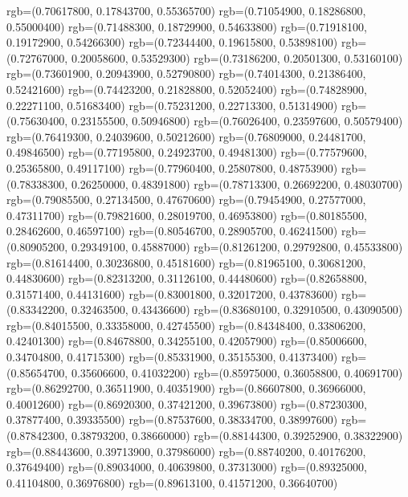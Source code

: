{{        rgb=(0.70617800, 0.17843700, 0.55365700)
        rgb=(0.71054900, 0.18286800, 0.55000400)
        rgb=(0.71488300, 0.18729900, 0.54633800)
        rgb=(0.71918100, 0.19172900, 0.54266300)
        rgb=(0.72344400, 0.19615800, 0.53898100)
        rgb=(0.72767000, 0.20058600, 0.53529300)
        rgb=(0.73186200, 0.20501300, 0.53160100)
        rgb=(0.73601900, 0.20943900, 0.52790800)
        rgb=(0.74014300, 0.21386400, 0.52421600)
        rgb=(0.74423200, 0.21828800, 0.52052400)
        rgb=(0.74828900, 0.22271100, 0.51683400)
        rgb=(0.75231200, 0.22713300, 0.51314900)
        rgb=(0.75630400, 0.23155500, 0.50946800)
        rgb=(0.76026400, 0.23597600, 0.50579400)
        rgb=(0.76419300, 0.24039600, 0.50212600)
        rgb=(0.76809000, 0.24481700, 0.49846500)
        rgb=(0.77195800, 0.24923700, 0.49481300)
        rgb=(0.77579600, 0.25365800, 0.49117100)
        rgb=(0.77960400, 0.25807800, 0.48753900)
        rgb=(0.78338300, 0.26250000, 0.48391800)
        rgb=(0.78713300, 0.26692200, 0.48030700)
        rgb=(0.79085500, 0.27134500, 0.47670600)
        rgb=(0.79454900, 0.27577000, 0.47311700)
        rgb=(0.79821600, 0.28019700, 0.46953800)
        rgb=(0.80185500, 0.28462600, 0.46597100)
        rgb=(0.80546700, 0.28905700, 0.46241500)
        rgb=(0.80905200, 0.29349100, 0.45887000)
        rgb=(0.81261200, 0.29792800, 0.45533800)
        rgb=(0.81614400, 0.30236800, 0.45181600)
        rgb=(0.81965100, 0.30681200, 0.44830600)
        rgb=(0.82313200, 0.31126100, 0.44480600)
        rgb=(0.82658800, 0.31571400, 0.44131600)
        rgb=(0.83001800, 0.32017200, 0.43783600)
        rgb=(0.83342200, 0.32463500, 0.43436600)
        rgb=(0.83680100, 0.32910500, 0.43090500)
        rgb=(0.84015500, 0.33358000, 0.42745500)
        rgb=(0.84348400, 0.33806200, 0.42401300)
        rgb=(0.84678800, 0.34255100, 0.42057900)
        rgb=(0.85006600, 0.34704800, 0.41715300)
        rgb=(0.85331900, 0.35155300, 0.41373400)
        rgb=(0.85654700, 0.35606600, 0.41032200)
        rgb=(0.85975000, 0.36058800, 0.40691700)
        rgb=(0.86292700, 0.36511900, 0.40351900)
        rgb=(0.86607800, 0.36966000, 0.40012600)
        rgb=(0.86920300, 0.37421200, 0.39673800)
        rgb=(0.87230300, 0.37877400, 0.39335500)
        rgb=(0.87537600, 0.38334700, 0.38997600)
        rgb=(0.87842300, 0.38793200, 0.38660000)
        rgb=(0.88144300, 0.39252900, 0.38322900)
        rgb=(0.88443600, 0.39713900, 0.37986000)
        rgb=(0.88740200, 0.40176200, 0.37649400)
        rgb=(0.89034000, 0.40639800, 0.37313000)
        rgb=(0.89325000, 0.41104800, 0.36976800)
        rgb=(0.89613100, 0.41571200, 0.36640700)
}}
